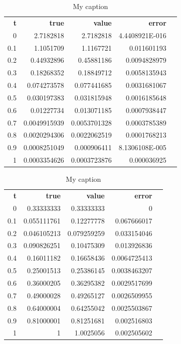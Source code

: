 \documentclass{article}
\begin{document}
\begin{table}[]
\centering
\caption{My caption}
\label{my-label}
\begin{tabular}{rrrrl}
\textbf{t} & \textbf{true} & \textbf{value} & \textbf{error} &  \\
0          & 2.7182818     & 2.7182818      & 4.4408921E-016 &  \\
0.1        & 1.1051709     & 1.1167721      & 0.011601193    &  \\
0.2        & 0.44932896    & 0.45881186     & 0.0094828979   &  \\
0.3        & 0.18268352    & 0.18849712     & 0.0058135943   &  \\
0.4        & 0.074273578   & 0.077441685    & 0.0031681067   &  \\
0.5        & 0.030197383   & 0.031815948    & 0.0016185648   &  \\
0.6        & 0.01227734    & 0.013071185    & 0.0007938447   &  \\
0.7        & 0.0049915939  & 0.0053701328   & 0.0003785389   &  \\
0.8        & 0.0020294306  & 0.0022062519   & 0.0001768213   &  \\
0.9        & 0.0008251049  & 0.000906411    & 8.1306108E-005 &  \\
1          & 0.0003354626  & 0.0003723876   & 0.000036925    
\end{tabular}
\end{table}


\begin{table}[]
\centering
\caption{My caption}
\label{my-label}
\begin{tabular}{rrrrl}
\textbf{t} & \textbf{true} & \textbf{value} & \textbf{error} &  \\
0          & 0.33333333    & 0.33333333     & 0              &  \\
0.1        & 0.055111761   & 0.12277778     & 0.067666017    &  \\
0.2        & 0.046105213   & 0.079259259    & 0.033154046    &  \\
0.3        & 0.090826251   & 0.10475309     & 0.013926836    &  \\
0.4        & 0.16011182    & 0.16658436     & 0.0064725413   &  \\
0.5        & 0.25001513    & 0.25386145     & 0.0038463207   &  \\
0.6        & 0.36000205    & 0.36295382     & 0.0029517699   &  \\
0.7        & 0.49000028    & 0.49265127     & 0.0026509955   &  \\
0.8        & 0.64000004    & 0.64255042     & 0.0025503867   &  \\
0.9        & 0.81000001    & 0.81251681     & 0.002516803    &  \\
1          & 1             & 1.0025056      & 0.002505602    & 
\end{tabular}
\end{table}
\end{document}
